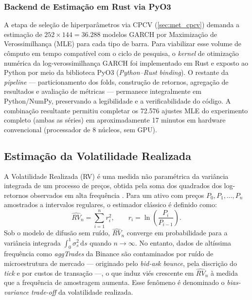 \subsubsection{Backend de Estimação em Rust via PyO3}
\label{subsubsec:rust_backend}

A etapa de seleção de hiperparâmetros via CPCV (\autoref{sec:met_cpcv})
demanda a estimação de $252 \times 144 = 36.288$ modelos GARCH por
Maximização de Verossimilhança (MLE) para cada tipo de barra.
Para viabilizar esse volume de cômputo em tempo compatível com o ciclo
de pesquisa, o \emph{kernel} de otimização numérica da log-verossimilhança
GARCH foi implementado em Rust e exposto ao Python por meio da biblioteca
PyO3 (\emph{Python--Rust binding}). O restante da \emph{pipeline} ---
particionamento dos folds, construção de retornos, agregação de resultados
e avaliação de métricas --- permanece integralmente em Python/NumPy,
preservando a legibilidade e a verificabilidade do código. A combinação
resultante permitiu completar os 72.576 ajustes MLE do experimento
completo (ambas as séries) em aproximadamente 17 minutos em hardware
convencional (processador de 8 núcleos, sem GPU).


\subsection{Estimação da Volatilidade Realizada}
\label{subsec:met_rv_estimacao}

A Volatilidade Realizada (RV) é uma medida não paramétrica da variância integrada de um processo de preços, obtida pela soma dos quadrados dos log-retornos observados em alta frequência \cite{andersen2003}. Para um ativo com preços $P_0, P_1, \ldots, P_n$ amostrados a intervalos regulares, o estimador clássico é definido como:
%
\begin{equation}
    \label{eq:rv_classica}
    \widehat{RV}_n = \sum_{i=1}^{n} r_i^2,
    \qquad r_i = \ln\!\left(\frac{P_i}{P_{i-1}}\right).
\end{equation}
%
Sob o modelo de difusão sem ruído, $\widehat{RV}_n$ converge em probabilidade para a variância integrada $\int_0^1 \sigma_s^2\,\mathrm{d}s$ quando $n \to \infty$. No entanto, dados de altíssima frequência como \emph{aggTrades} da Binance são contaminados por ruído de microestrutura de mercado --- originado pelo \emph{bid-ask bounce}, pela discrição do \emph{tick} e por custos de transação ---, o que induz viés crescente em $\widehat{RV}_n$ à medida que a frequência de amostragem aumenta. Esse fenômeno é denominado o \emph{bias-variance trade-off} da volatilidade realizada.


